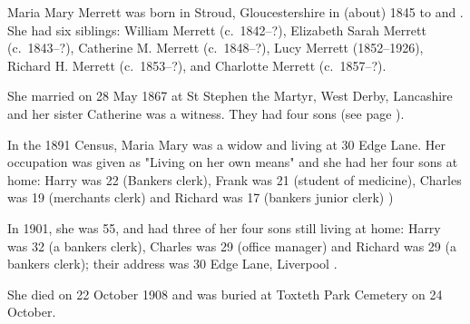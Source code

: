 
Maria Mary Merrett was born in Stroud, Gloucestershire in (about) 1845 to  and .
She had  six siblings: William Merrett (c.~1842--?), Elizabeth Sarah Merrett (c.~1843--?), Catherine M. Merrett (c.~1848--?), Lucy Merrett (1852--1926), Richard H. Merrett (c.~1853--?), and Charlotte Merrett (c.~1857--?).

She married  on 28 May 1867 at St Stephen the Martyr, West Derby, Lancashire \cite{MariaMerrettMarriage} and her sister Catherine was a witness.
They had four sons (see page \pageref{Harry_Hancox}).

In the 1891 Census, Maria Mary was a widow and living at 30 Edge Lane. Her occupation was given as "Living on her own means" and she had her four sons at home: Harry was 22 (Bankers clerk), Frank was 21 (student of medicine), Charles was 19 (merchants clerk) and Richard was 17 (bankers junior clerk) \cite{MariaMerrettOccupation})

In 1901, she was 55, and had three of her four sons still living at home: Harry was 32 (a bankers clerk), Charles was 29 (office manager) and Richard was 29 (a bankers clerk); their address was 30 Edge Lane, Liverpool \cite{MariaMerrettResidence}.

She died on 22 October 1908 and was buried at Toxteth Park Cemetery on 24 October. \cite{MariaMerrettDeath}
